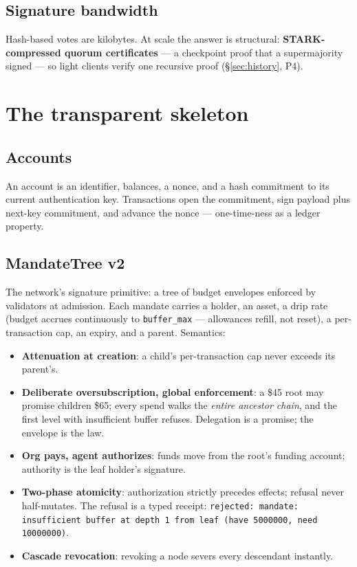 \documentclass[11pt]{article}
\newcommand{\ct}[1]{\texttt{#1}}
\begin{document}
\subsection{Signature bandwidth}
Hash-based votes are kilobytes. At scale the answer is structural: \textbf{STARK-compressed quorum certificates} --- a checkpoint proof that a supermajority signed --- so light clients verify one recursive proof (\S\ref{sec:history}, P4).

\section{The transparent skeleton}
\subsection{Accounts}
An account is an identifier, balances, a nonce, and a hash commitment to its current authentication key. Transactions open the commitment, sign payload plus next-key commitment, and advance the nonce --- one-time-ness as a ledger property.

\subsection{MandateTree v2}\label{sec:mandate}
The network's signature primitive: a tree of budget envelopes enforced by validators at admission. Each mandate carries a holder, an asset, a drip rate (budget accrues continuously to \ct{buffer\_max} --- allowances refill, not reset), a per-transaction cap, an expiry, and a parent. Semantics:
\begin{itemize}[leftmargin=1.4em,itemsep=2pt]
  \item \textbf{Attenuation at creation}: a child's per-transaction cap never exceeds its parent's.
  \item \textbf{Deliberate oversubscription, global enforcement}: a \$45 root may promise children \$65; every spend walks the \emph{entire ancestor chain}, and the first level with insufficient buffer refuses. Delegation is a promise; the envelope is the law.
  \item \textbf{Org pays, agent authorizes}: funds move from the root's funding account; authority is the leaf holder's signature.
  \item \textbf{Two-phase atomicity}: authorization strictly precedes effects; refusal never half-mutates. The refusal is a typed receipt: \ct{rejected: mandate: insufficient buffer at depth 1 from leaf (have 5000000, need 10000000)}.
  \item \textbf{Cascade revocation}: revoking a node severs every descendant instantly.
\end{itemize}
\end{document}
